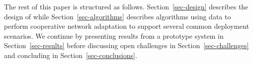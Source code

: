 The rest of this paper is structured as follows. Section~\ref{sec-design}
describes the design of \PS{} while Section~\ref{sec-algorithms} describes
algorithms using \PS{} data to perform cooperative network adaptation to
support several common deployment scenarios. We continue by presenting
results from a prototype \PS{} system in Section~\ref{sec-results} before
discussing open challenges in Section~\ref{sec-challenges} and concluding in
Section~\ref{sec-conclusions}.
